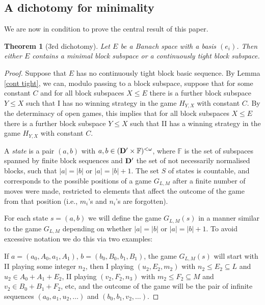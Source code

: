 \documentclass[10pt]{amsart}
\numberwithin{equation}{section}
\newtheorem{thm}{Theorem}[section]
\begin{document}
\subsection{A dichotomy for minimality}
We are now in condition to prove the central result of this paper.

\begin{thm}[3rd dichotomy]\label{3rddichotomy}
Let $E$ be a Banach space with a basis $(e_i)$. Then either $E$ contains a
minimal block subspace or a continuously tight block subspace.
\end{thm}

\begin{proof}
Suppose that $E$ has no continuously tight block basic sequence. By Lemma
\ref{cont tight}, we can, modulo  passing to a block subspace, suppose that for
some constant $C$ and for all block subspaces $X{\ensuremath{\leqslant}} E$ there is a further
block subspace $Y{\ensuremath{\leqslant}} X$ such that I has no winning strategy in the game
$H_{Y,X}$ with constant $C$. By the determinacy of open games, this implies
that for all block subspaces $X{\ensuremath{\leqslant}} E$ there is a further block subspace $Y{\ensuremath{\leqslant}}
X$ such that II has a winning strategy in the game $H_{Y,X}$ with constant $C$.

A {\em state} is a pair $(a,b)$ with $a,b\in ({\bf D}'\times {\mathbb F})^{<{\omega}}$, where
$\mathbb F$ is the set of subspaces spanned by finite block sequences and ${\bf
D}'$ the set of not necessarily normalised blocks,  such that $|a|=|b|$ or
$|a|=|b|+1$. The set $S$ of states is countable, and corresponds to the
possible positions of a game $G_{L,M}$ after a finite number of moves were
made, restricted to elements that affect the outcome of the game from that
position (i.e., $m_i$'s and $n_i$'s are forgotten).

For each state $s=(a,b)$ we will define the game $G_{L,M}(s)$ in a manner
similar to the game $G_{L,M}$ depending on whether  $|a|=|b|$ or $|a|=|b|+1$.
To avoid excessive notation we do this via two examples:

If $a=(a_0,A_0,a_1,A_1)$,
$b=(b_0,B_0,b_1,B_1)$, the game $G_{L,M}(s)$ will start with II playing some integer
$n_2$, then I playing $(u_2,E_2,m_2)$ with $n_2 {\ensuremath{\leqslant}} E_2 \subseteq L$ and $u_2 \in A_0+A_1+E_2$, II playing $(v_2,F_2,n_3)$
with $m_2 {\ensuremath{\leqslant}} F_2 \subseteq M$ and $v_2 \in B_0+B_1+F_2$,  etc, and the outcome of the game will be
the pair of infinite sequences $(a_0,a_1,u_2,\ldots)$ and $(b_0,b_1,v_2,\ldots)$.


\end{proof}
\end{document}

